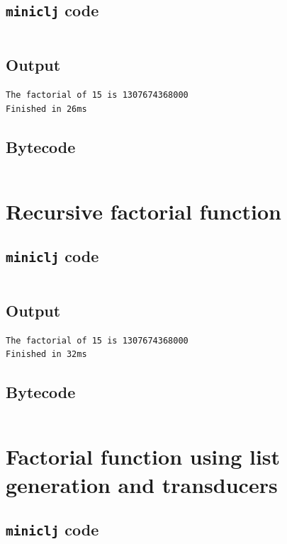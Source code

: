 \documentclass[11pt]{scrreprt}
\begin{document}
\subsection{\texttt{miniclj} code}
\inputminted{clojure}{/home/mario/git/MarioJim/miniclj/examples/cyclic_factorial.clj}

\subsection{Output}
\begin{verbatim}
The factorial of 15 is 1307674368000
Finished in 26ms
\end{verbatim}

\subsection{Bytecode}
\inputminted{text}{/home/mario/git/MarioJim/miniclj/examples/cyclic_factorial.mclj}


\section{Recursive factorial function}
\subsection{\texttt{miniclj} code}
\inputminted{clojure}{/home/mario/git/MarioJim/miniclj/examples/recursive_factorial.clj}

\subsection{Output}
\begin{verbatim}
The factorial of 15 is 1307674368000
Finished in 32ms
\end{verbatim}

\subsection{Bytecode}
\inputminted{text}{/home/mario/git/MarioJim/miniclj/examples/recursive_factorial.mclj}


\section{Factorial function using list generation and transducers}
\subsection{\texttt{miniclj} code}
\inputminted{clojure}{/home/mario/git/MarioJim/miniclj/examples/reduce_factorial.clj}
\end{document}
